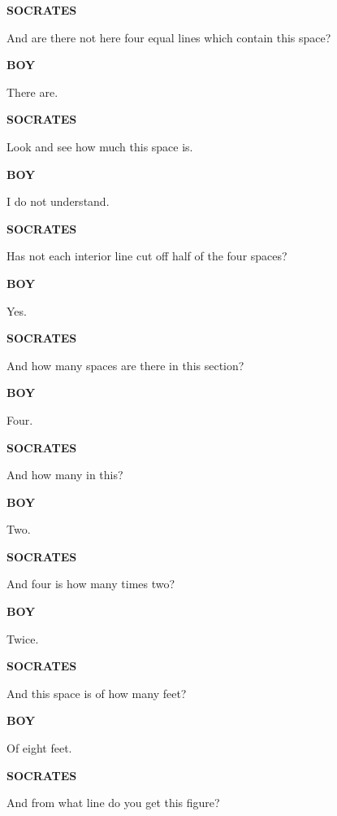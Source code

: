 \documentclass[11pt,letter]{article}
\begin{document}
\par \textbf{SOCRATES}
\par   And are there not here four equal lines which contain this space?

\par \textbf{BOY}
\par   There are.

\par \textbf{SOCRATES}
\par   Look and see how much this space is.

\par \textbf{BOY}
\par   I do not understand.

\par \textbf{SOCRATES}
\par   Has not each interior line cut off half of the four spaces?

\par \textbf{BOY}
\par   Yes.

\par \textbf{SOCRATES}
\par   And how many spaces are there in this section?

\par \textbf{BOY}
\par   Four.

\par \textbf{SOCRATES}
\par   And how many in this?

\par \textbf{BOY}
\par   Two.

\par \textbf{SOCRATES}
\par   And four is how many times two?

\par \textbf{BOY}
\par   Twice.

\par \textbf{SOCRATES}
\par   And this space is of how many feet?

\par \textbf{BOY}
\par   Of eight feet.

\par \textbf{SOCRATES}
\par   And from what line do you get this figure?
\end{document}
